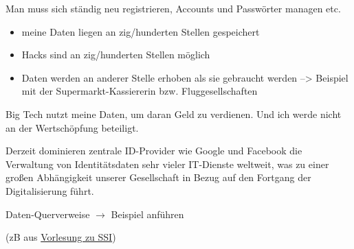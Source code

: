 \begin{Problem}[mangelhafte UX]

Man muss sich ständig neu registrieren, Accounts und Passwörter managen etc.

\end{Problem}

\vspace{0.3cm}



\begin{Problem}[Datenschutz]

\begin{itemize}
  \item meine Daten liegen an zig/hunderten Stellen gespeichert
  \item Hacks sind an zig/hunderten Stellen möglich
  \item Daten werden an anderer Stelle erhoben als sie gebraucht werden --> Beispiel mit der Supermarkt-Kassiererin bzw. Fluggesellschaften
\end{itemize}

\end{Problem}

\vspace{0.3cm}


\begin{Problem}

Big Tech nutzt meine Daten, um daran Geld zu verdienen. Und ich werde nicht an der Wertschöpfung beteiligt.

\end{Problem}

\vspace{0.3cm}


\begin{Problem}

Derzeit dominieren zentrale ID-Provider wie Google und Facebook die Verwaltung von Identitätsdaten sehr vieler IT-Dienste weltweit, was zu einer großen Abhängigkeit unserer Gesellschaft in Bezug auf den Fortgang der Digitalisierung führt.

\end{Problem}

\vspace{0.3cm}


\begin{Problem}

Daten-Querverweise $\rightarrow$ Beispiel anführen 

(zB aus \href{https://norbert-pohlmann.com/glossar-cyber-sicherheit/self-sovereign-identity-ssi/}{Vorlesung zu SSI})

\end{Problem}

\vspace{0.5cm}
